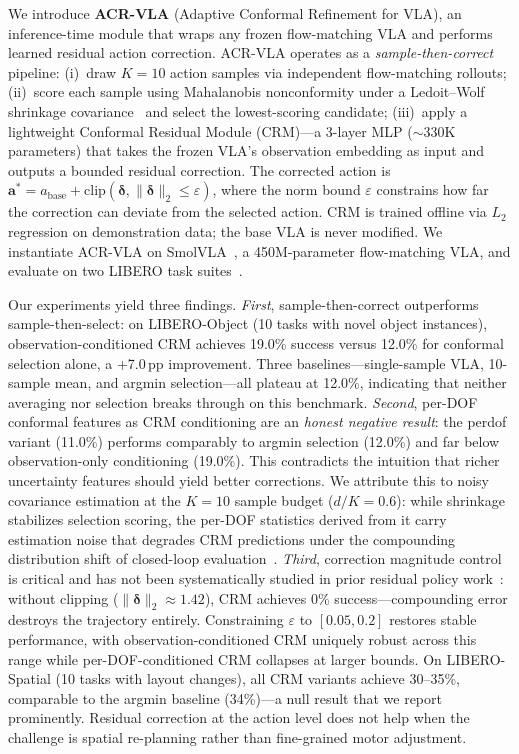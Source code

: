 We introduce \textbf{ACR-VLA} (Adaptive Conformal Refinement for VLA), an inference-time module that wraps any frozen flow-matching VLA and performs learned residual action correction.
ACR-VLA operates as a \emph{sample-then-correct} pipeline:
(i)~draw $K{=}10$ action samples via independent flow-matching rollouts;
(ii)~score each sample using Mahalanobis nonconformity under a Ledoit--Wolf shrinkage covariance~\cite{braun2025cgs} and select the lowest-scoring candidate;
(iii)~apply a lightweight Conformal Residual Module (CRM)---a 3-layer MLP (${\sim}$330K parameters) that takes the frozen VLA's observation embedding as input and outputs a bounded residual correction.
The corrected action is $\mathbf{a}^* = a_{\mathrm{base}} + \mathrm{clip}(\boldsymbol{\delta}, \|\boldsymbol{\delta}\|_2 \leq \varepsilon)$, where the norm bound $\varepsilon$ constrains how far the correction can deviate from the selected action.
CRM is trained offline via $L_2$ regression on demonstration data; the base VLA is never modified.
We instantiate ACR-VLA on SmolVLA~\cite{shukor2025smolvla}, a 450M-parameter flow-matching VLA, and evaluate on two LIBERO task suites~\cite{liu2023libero}.

Our experiments yield three findings.
\emph{First}, sample-then-correct outperforms sample-then-select: on LIBERO-Object (10 tasks with novel object instances), observation-conditioned CRM achieves 19.0\% success versus 12.0\% for conformal selection alone, a +7.0\,pp improvement.
Three baselines---single-sample VLA, 10-sample mean, and argmin selection---all plateau at 12.0\%, indicating that neither averaging nor selection breaks through on this benchmark.
\emph{Second}, per-DOF conformal features as CRM conditioning are an \emph{honest negative result}: the perdof variant (11.0\%) performs comparably to argmin selection (12.0\%) and far below observation-only conditioning (19.0\%).
This contradicts the intuition that richer uncertainty features should yield better corrections.
We attribute this to noisy covariance estimation at the $K{=}10$ sample budget ($d/K = 0.6$): while shrinkage stabilizes selection scoring, the per-DOF statistics derived from it carry estimation noise that degrades CRM predictions under the compounding distribution shift of closed-loop evaluation~\cite{ross2011dagger}.
\emph{Third}, correction magnitude control is critical and has not been systematically studied in prior residual policy work~\cite{silver2018residual,jiang2024transic,xiao2026pld}: without clipping ($\|\boldsymbol{\delta}\|_2 \approx 1.42$), CRM achieves 0\% success---compounding error destroys the trajectory entirely.
Constraining $\varepsilon$ to $[0.05, 0.2]$ restores stable performance, with observation-conditioned CRM uniquely robust across this range while per-DOF-conditioned CRM collapses at larger bounds.
On LIBERO-Spatial (10 tasks with layout changes), all CRM variants achieve 30--35\%, comparable to the argmin baseline (34\%)---a null result that we report prominently.
Residual correction at the action level does not help when the challenge is spatial re-planning rather than fine-grained motor adjustment.

